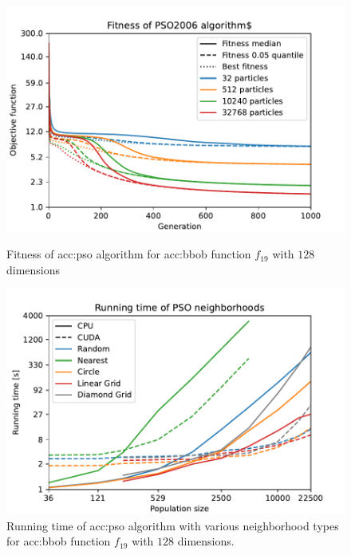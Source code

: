 \begin{figure}
    \begin{minipage}[t]{0.48\textwidth}
        \includegraphics[width=\textwidth]{img/runs/fitness_pso2006_with_legend.pdf}
        \caption[Fitness of \acrshort*{acc:pso}]{Fitness of \acrshort{acc:pso} algorithm for \acrshort{acc:bbob} function $f_{19}$ with $128$ dimensions}
        \label{fig:psofitness}
    \end{minipage}
    \hfill
    \begin{minipage}[t]{0.48\textwidth}
        \includegraphics[width=\textwidth]{img/runs/time_pso_neigh_with_legend.pdf}
        \caption[Running time of \acrshort*{acc:pso} neighborhoods]{Running time of \acrshort{acc:pso} algorithm with  various neighborhood types for \acrshort{acc:bbob} function $f_{19}$ with $128$ dimensions.}
        \label{fig:psoneigtime}
    \end{minipage}
\end{figure}

